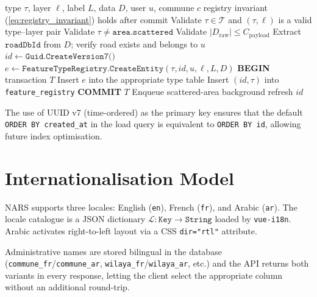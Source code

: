 \documentclass[12pt,a4paper]{article}
\theoremstyle{definition}
\theoremstyle{plain}
\theoremstyle{remark}
\newcommand{\abs}[1]{\left\lvert #1 \right\rvert}
\begin{document}
\begin{algorithm}[H]
\caption{SaveFeature transactional protocol}
\label{alg:save}
\begin{algorithmic}[1]
\Require type $\tau$, layer $\ell$, label $L$, data $D$, user $u$, commune $c$
\Ensure registry invariant (\ref{eq:registry_invariant}) holds after commit
\State Validate $\tau \in \mathcal{T}$ and $(\tau, \ell)$ is a valid type--layer pair
\State Validate $\tau \neq \texttt{area.scattered}$ 
\State Validate $\abs{D_{\text{raw}}} \leq C_{\text{payload}}$ 
  \State Extract $\texttt{roadDbId}$ from $D$; verify road exists and belongs to $u$
\EndIf
\State $\mathit{id} \leftarrow \texttt{Guid.CreateVersion7()}$ 
\State $e \leftarrow \texttt{FeatureTypeRegistry.CreateEntity}(\tau, \mathit{id}, u, \ell, L, D)$
\State \textbf{BEGIN} transaction $T$
\State Insert $e$ into the appropriate type table
\State Insert $(\mathit{id}, \tau)$ into \texttt{feature\_registry}
\State \textbf{COMMIT} $T$
  \State Enqueue scattered-area background refresh
\EndIf
\State \Return $\mathit{id}$
\end{algorithmic}
\end{algorithm}

The use of UUID v7 (time-ordered)\cite{uuid7} as the primary key ensures that
the default \texttt{ORDER BY created\_at} in the load query is equivalent
to \texttt{ORDER BY id}, allowing future index optimisation.

\section{Internationalisation Model}
\label{sec:i18n}

NARS supports three locales: English (\texttt{en}), French (\texttt{fr}),
and Arabic (\texttt{ar}). The locale catalogue is a JSON dictionary
$\mathcal{L}: \texttt{Key} \to \texttt{String}$ loaded by \texttt{vue-i18n}.
Arabic activates right-to-left layout via a CSS \texttt{dir="rtl"} attribute.

Administrative names are stored bilingual in the database
(\texttt{commune\_fr}/\texttt{commune\_ar},
\texttt{wilaya\_fr}/\texttt{wilaya\_ar}, etc.) and the API returns both
variants in every response, letting the client select the appropriate
column without an additional round-trip.
\end{document}
